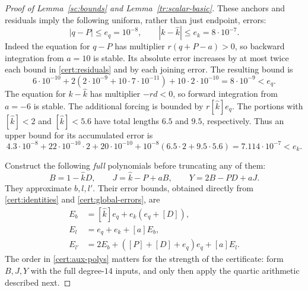 \begin{proof}[Proof of Lemma~\ref{sc:bounds} and Lemma~\ref{tr:scalar-basic}]
These anchors and residuals imply the following
uniform, rather than just endpoint, errors:
\begin{equation}\label{cert:global-errors}
 |q-P|\le e_q=10^{-8},\qquad |k-\widehat k|\le e_k=8\cdot10^{-7}.
\end{equation}
Indeed the equation for $q-P$ has multiplier $r(q+P-a)>0$, so backward
integration from $a=10$ is stable. Its absolute error increases by at most
twice each bound in \eqref{cert:residuals} and by each joining error.
The resulting bound is
\[
 6\cdot10^{-10}+2(2\cdot10^{-9}+10\cdot7\cdot10^{-11})
       +10\cdot2\cdot10^{-10}=8\cdot10^{-9}<e_q.
\]
The equation for $k-\widehat k$ has multiplier $-rd<0$, so forward integration
from $a=-6$ is stable. The additional forcing is bounded by $r[\widehat k]e_q$.
The portions with $[\widehat k]<2$ and $[\widehat k]<5.6$ have total lengths $6.5$ and
$9.5$, respectively. Thus an upper bound for its accumulated error is
\[
 4.3\cdot10^{-8}+22\cdot10^{-10}\cdot2
       +20\cdot10^{-10}
       +10^{-8}(6.5\cdot2+9.5\cdot5.6)
 =7.114\cdot10^{-7}<e_k.
\]

Construct the following \emph{full} polynomials before truncating any of
them:
\begin{equation}\label{cert:aux-polys}
 B=1-\widehat k D,\qquad J=\widehat k-P+aB,\qquad Y=2B-PD+aJ.
\end{equation}
They approximate $b,l,l'$. Their error bounds, obtained directly from
\eqref{cert:identities} and \eqref{cert:global-errors}, are
\begin{equation}\label{cert:aux-errors}
 \begin{split}
 E_b&=[\widehat k]e_q+e_k(e_q+[D]),\\
 E_l&=e_q+e_k+[a]E_b,\\
 E_{l'}&=2E_b+([P]+[D]+e_q)e_q+[a]E_l.
 \end{split}
\end{equation}
The order in \eqref{cert:aux-polys} matters for the strength of the
certificate: form $B,J,Y$ with the full degree-$14$ inputs, and only then
apply the quartic arithmetic described next.


\end{proof}
